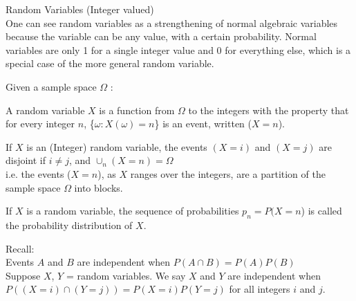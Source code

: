 Random Variables (Integer valued)\\
One can see random variables as a strengthening of normal algebraic variables because the variable can be any value, with a certain probability.  Normal variables are only 1 for a single integer value and 0 for everything else, which is a special case of the more general random variable.

Given a sample space $\Omega$ :

A random variable $X$ is a  function from $\Omega$ to the integers with the property that for every integer $n$, \{$\omega:X(\omega) = n$\} is an event, written ($X = n$).

If $X$ is an (Integer) random variable, the events $(X = i)$ and $(X = j)$ are disjoint if $i \neq j$, and $\cup_{n} (X = n) = \Omega$\\
i.e. the events ($X = n$), as $X$ ranges over the integers, are a partition of the sample space $\Omega$ into blocks.

If $X$ is a random variable, the sequence of probabilities $p_n = P(X = n$) is called the probability distribution of $X$.

Recall:\\
Events $A$ and $B$ are independent when $P(A \cap B) = P(A)P(B)$\\
Suppose $X$, $Y$ = random variables.  We say $X$ and $Y$ are independent when \\
$P((X = i) \cap (Y = j)) = P(X = i)P(Y = j)$ for all integers $i$ and $j$.




